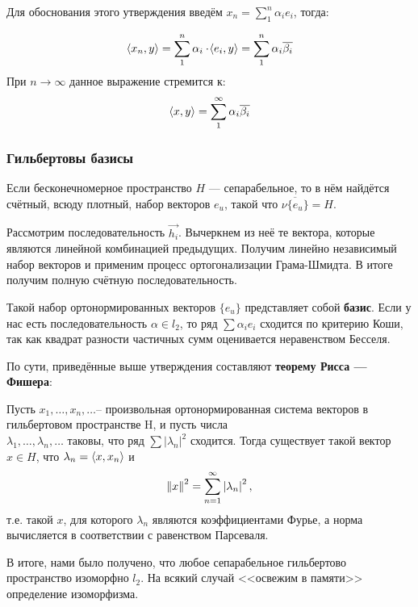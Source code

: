 \documentclass[12pt]{article}
\begin{document}
			Для обоснования этого утверждения введём $x_n = \sum_1^n \alpha_i e_i$, тогда:

			$$ \left\langle x_n, y \right\rangle = \sum_1^n \alpha_i \cdot \! \left\langle e_i, y \right\rangle = \sum_1^n \alpha_i \overline{\beta_i}$$
			При $n \rightarrow \infty$ данное выражение стремится к:
			$$ \left\langle x, y \right\rangle = \sum_1^{\infty} \alpha_i \overline{\beta_i} $$

		\subsubsection{Гильбертовы базисы}

			Если бесконечномерное пространство $H$ --- сепарабельное, то в нём найдётся счётный, всюду плотный, набор векторов $e_u$, такой что $\overline{ \nu \{ e_u \} } = H$.

			Рассмотрим последовательность $\vec{h_i}$. Вычеркнем из неё те вектора, которые являются линейной комбинацией предыдущих.
			Получим линейно независимый набор векторов и применим процесс ортогонализации Грама-Шмидта. В итоге получим полную счётную 
			последовательность.

			Такой набор ортонормированных векторов $\{ e_u \}$ представляет собой \textbf{базис}. Если у нас
			есть последовательность $\alpha \in l_2$, то ряд $\sum \alpha_i e_i$ сходится по критерию Коши,
			так как квадрат разности частичных сумм оценивается неравенством Бесселя.

			По сути, приведённые выше утверждения составляют \textbf{теорему Рисса --- Фишера}:
			\begin{theorem}
				Пусть $x_1, \dots ,x_n, \dots $-- произвольная ортонормированная система векторов в гильбертовом пространстве H, и пусть 
				числа \\
				$\lambda _1, \dots ,\lambda _n, \dots $ таковы, что ряд $\sum |\lambda_n|^2$ сходится. Тогда существует такой 
				вектор $x\in H$, что $\lambda _n=\left\langle x, x_n \right\rangle$ и
				$$
					\left\| x \right\| ^2=\sum_{n=1}^{\infty } \left| \lambda_n \right|^2,
				$$
				т.е. такой $x$, для которого $\lambda_n$ являются коэффициентами Фурье, а норма вычисляется в 
				соответствии с равенством Парсеваля. 
			\end{theorem}

	
			В итоге, нами было получено, что любое сепарабельное гильбертово пространство изоморфно $l_2$.
			На всякий случай <<освежим в памяти>> определение изоморфизма.
	
\end{document}
